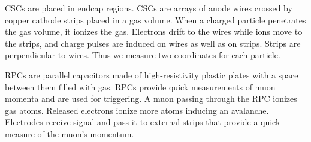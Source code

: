 
CSCs are placed in endcap regions. CSCs are arrays of anode wires crossed by copper cathode strips placed in a gas volume. When a charged particle penetrates the gas volume, it ionizes the gas. Electrons drift to the wires while ions move to the strips, and charge pulses are induced on wires as well as on strips. Strips are perpendicular to wires. Thus we measure two coordinates for each particle.  

RPCs are parallel capacitors made of high-resistivity plastic plates with a space between them filled with gas. RPCs provide quick measurements of muon momenta and are used for triggering. A muon passing through the RPC ionizes gas atoms. Released electrons ionize more atoms inducing an avalanche. Electrodes receive signal and pass it to external strips that provide a quick measure of the muon's momentum. 


